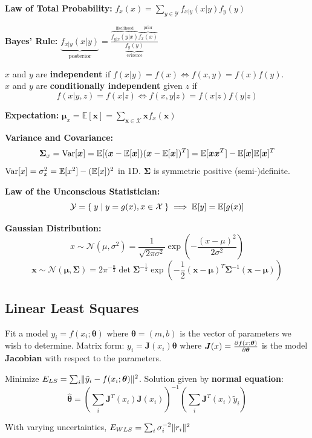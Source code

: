 \documentclass[twocolumn, 10pt]{extarticle}
\begin{document}
\textbf{Law of Total Probability:} \(\displaystyle f_x(x) = \sum _{y \in \mathcal Y} f_{x|y}(x|y)f_y(y)\)

\textbf{Bayes' Rule:}
$\displaystyle \underbrace{f_{x|y}(x|y)}_{\text{posterior}} = \frac{\overbrace{f_{y|x}(y|x)}^{\text{likelihood}}\overbrace{f_x(x)}^{\text{prior}}}{\underbrace{f_y(y)}_{\text{evidence}}}$

$x$ and $y$ are \textbf{independent} if $f(x|y) = f(x) \iff f(x, y) = f(x)f(y)$.\\
$x$ and $y$ are \textbf{conditionally independent} given $z$ if $$f(x|y, z) = f(x|z) \iff f(x, y|z) = f(x|z)f(y|z)$$

\textbf{Expectation:}
$\displaystyle\bm\mu _x = \mathbb E[\bm x] = \sum _{\bm x \in \mathcal X} \bm xf_x(\bm x)$

\textbf{Variance and Covariance:}
$$\bm\Sigma _x = \operatorname{Var}[\bm x] = \mathbb E[(\bm x - \mathbb E[\bm x])(\bm x - \mathbb E[\bm x])^T] = \mathbb E[\bm x\bm x^T] - \mathbb E[\bm x]\mathbb E[\bm x]^T$$
$\operatorname{Var}[x] = \sigma _x^2 = \mathbb E[x^2] - (\mathbb E[x])^2$ in 1D.
$\bm\Sigma$ is symmetric positive (semi-)definite.

\textbf{Law of the Unconscious Statistician:} $$\mathcal Y = \Set{y | y = g(x), x \in \mathcal X} \implies \mathbb E[y] = \mathbb E[g(x)]$$

\textbf{Gaussian Distribution:}
\[x \sim \mathcal N(\mu, \sigma^2) = \frac{1}{\sqrt{2\pi\sigma^2}}\exp\left(-\frac{(x - \mu)^2}{2\sigma^2}\right)\]
\[
\bm x \sim \mathcal N(\bm\mu, \bm\Sigma) = 2\pi^{-\frac{n}{2}}\det\bm\Sigma^{-\frac{1}{2}}\exp\left(-\frac{1}{2}(\bm x - \bm\mu)^T\bm\Sigma^{-1}(\bm x - \bm\mu)\right)
\]

\subsection{Linear Least Squares}

Fit a model $y_i = f(x_i; \bm\theta)$ where $\bm\theta = (m, b)$ is the vector of parameters we wish to determine.
Matrix form: $y_i = \bm J(x_i)\bm\theta$ where $\bm J(x) = \frac{\partial f(x; \bm\theta)}{\partial\bm\theta}$ is the model
\textbf{Jacobian} with respect to the parameters.

Minimize \(E_{LS} = \sum _i \lVert\tilde y_i - f(x_i; \bm\theta)\rVert^2\). Solution given by \textbf{normal equation}:
\[
\hat{\bm \theta} = \left(\sum _i\bm J^T(x_i)\bm J(x_i)\right)^{-1}\left(\sum _i \bm J^T(x_i)\tilde y_i\right)
\]

With varying uncertainties, \(E_{WLS} = \sum _i \sigma _i^{-2}\lVert r_i\rVert^2\)
\end{document}
